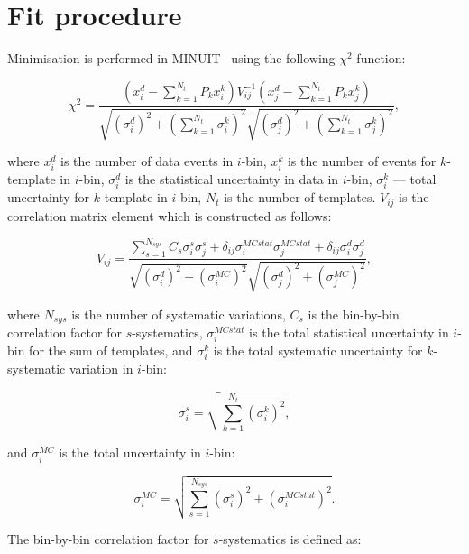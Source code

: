 \documentclass[12pt]{article}
\begin{document}
\section{Fit procedure}

Minimisation is performed in MINUIT~\cite{Minuit} using the following
$\chi^2$ function:

\begin{equation}
\chi^2 = \frac{
(x^{d}_{i}-\sum\limits_{k=1}^{N_{t}}P_{k}x^{k}_{i})
V_{ij}^{-1}
(x^{d}_{j}-\sum\limits_{k=1}^{N_{t}}P_{k}x^{k}_{j})
}
{\sqrt{
(\sigma_{i}^{d})^2 +
(\sum\limits_{k=1}^{N_{t}}\sigma_{i}^{k})^2
}
\sqrt{
(\sigma_{j}^{d})^2 +
(\sum\limits_{k=1}^{N_{t}}\sigma_{j}^{k})^2
}
},
\end{equation}

\noindent where $x^{d}_{i}$ is the number of data events in $i$-bin,
$x^{k}_{i}$ is the number of events for $k$-template in $i$-bin,
$\sigma_{i}^{d}$ is the statistical uncertainty in data in $i$-bin,
$\sigma_{i}^{k}$ --- total uncertainty for $k$-template in $i$-bin,
$N_{t}$ is the number of templates.
$V_{ij}$ is the correlation matrix element which is constructed as follows:

\begin{equation}
V_{ij} = \frac{\sum\limits_{s=1}^{N_{sys}} C_{s}
\sigma_{i}^{s}\sigma_{j}^{s} +
\delta_{ij}\sigma_{i}^{MCstat}\sigma_{j}^{MCstat} +
\delta_{ij}\sigma_{i}^{d}\sigma_{j}^{d}}
{\sqrt{
(\sigma_{i}^{d})^2 +
(\sigma_{i}^{MC})^2
}
\sqrt{
(\sigma_{j}^{d})^2 +
(\sigma_{j}^{MC})^2
}
},
\end{equation}

\noindent where $N_{sys}$ is the number of systematic variations,
$C_{s}$ is the bin-by-bin correlation factor for $s$-systematics,
$\sigma_{i}^{MCstat}$ is the total statistical uncertainty in $i$-bin
for the sum of templates, and $\sigma_{i}^{k}$ is the total
systematic uncertainty for $k$-systematic variation in $i$-bin:

\begin{equation}
\sigma_{i}^{s} = \sqrt{\sum\limits_{k=1}^{N_{t}}(\sigma_{i}^{k})^{2}},
\end{equation}

\noindent and $\sigma_{i}^{MC}$ is the total uncertainty in $i$-bin:

\begin{equation}
\sigma_{i}^{MC} = \sqrt{\sum\limits_{s=1}^{N_{sys}}(\sigma_{i}^{s})^2+(\sigma_{i}^{MCstat})^2}.
\end{equation}

\noindent The bin-by-bin correlation factor for $s$-systematics is
defined as:
\end{document}
